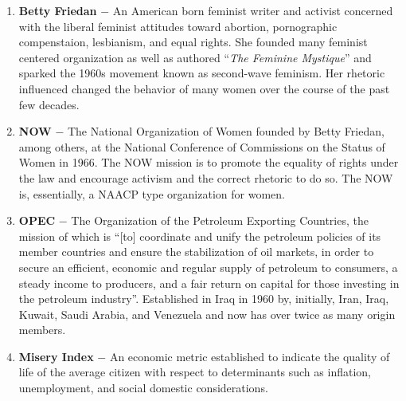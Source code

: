 \documentclass[12pt]{article}
\begin{document}
\begin{flushleft}
\begin{enumerate}
    \item \textbf{Betty Friedan} $-$ An American born feminist writer and activist concerned with the liberal feminist attitudes toward abortion, pornographic compenstaion, lesbianism, and equal rights. She founded many feminist centered organization as well as authored ``\emph{The Feminine Mystique}'' and sparked the 1960s movement known as second-wave feminism. Her rhetoric influenced changed the behavior of many women over the course of the past few decades.

    \item \textbf{NOW} $-$ The National Organization of Women founded by Betty Friedan, among others, at the National Conference of Commissions on the Status of Women in 1966. The NOW mission is to promote the equality of rights under the law and encourage activism and the correct rhetoric to do so. The NOW is, essentially, a NAACP type organization for women. 

    \item \textbf{OPEC} $-$ The Organization of the Petroleum Exporting Countries, the mission of which is ``[to] coordinate and unify the petroleum policies of its member countries and ensure the stabilization of oil markets, in order to secure an efficient, economic and regular supply of petroleum to consumers, a steady income to producers, and a fair return on capital for those investing in the petroleum industry''. Established in Iraq in 1960 by, initially, Iran, Iraq, Kuwait, Saudi Arabia, and Venezuela and now has over twice as many origin members. 

    \item \textbf{Misery Index} $-$ An economic metric established to indicate the quality of life of the average citizen with respect to determinants such as inflation, unemployment, and social domestic considerations.

\end{enumerate}
\end{flushleft}
\end{document}
